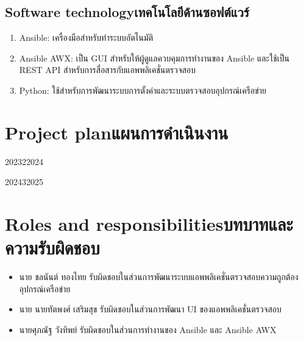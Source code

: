 \subsection{\ifenglish Software technology\else เทคโนโลยีด้านซอฟต์แวร์\fi}
\begin{enumerate}
    \item {Ansible: เครื่องมือสำหรับทำระบบอัตโนมัติ}
    \item {Ansible AWX: เป็น GUI สำหรับให้ผู้ดูแลควบคุมการทำงานของ Ansible และใช้เป็น REST API สำหรับการสื่อสารกับแอพพลิเคชั่นตรวจสอบ}
    \item {Python: ใช้สำหรับการพัฒนาระบบการตั้งค่าและระบบตรวจสอบอุปกรณ์เครือข่าย}
\end{enumerate}
\section{\ifenglish Project plan\else แผนการดำเนินงาน\fi}

\begin{plan}{11}{2023}{2}{2024}
\end{plan}

\begin{plan}{11}{2024}{3}{2025}
\end{plan}

\section{\ifenglish Roles and responsibilities\else บทบาทและความรับผิดชอบ\fi}
\begin{itemize}
    \item นาย ชลนันต์ ทองไทย รับผิดชอบในส่วนการพัฒนาระบบแอพพลิเคชั่นตรวจสอบความถูกต้องอุปกรณ์เครือข่าย
    \item นาย นายทัตพงศ์ เสริมสุข รับผิดชอบในส่วนการพัฒนา UI ของแอพพลิเคชั่นตรวจสอบ
    \item นายศุภณัฐ วังทิพย์ รับผิดชอบในส่วนการทำงานของ Ansible และ Ansible AWX
\end{itemize}

